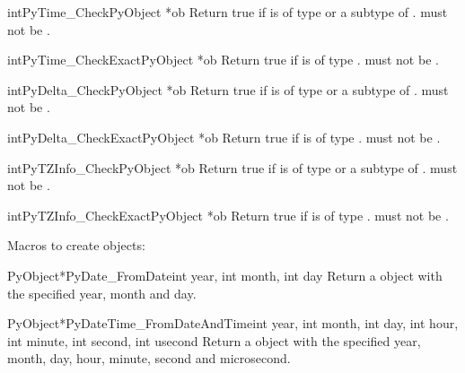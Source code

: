 \begin{cfuncdesc}{int}{PyTime_Check}{PyObject *ob}
  Return true if  is of type  or
  a subtype of .   must not be
  \NULL{}.
\end{cfuncdesc}

\begin{cfuncdesc}{int}{PyTime_CheckExact}{PyObject *ob}
  Return true if  is of type .
   must not be \NULL{}.
\end{cfuncdesc}

\begin{cfuncdesc}{int}{PyDelta_Check}{PyObject *ob}
  Return true if  is of type  or
  a subtype of .   must not be
  \NULL{}.
\end{cfuncdesc}

\begin{cfuncdesc}{int}{PyDelta_CheckExact}{PyObject *ob}
  Return true if  is of type .
   must not be \NULL{}.
\end{cfuncdesc}

\begin{cfuncdesc}{int}{PyTZInfo_Check}{PyObject *ob}
  Return true if  is of type  or
  a subtype of .   must not be
  \NULL{}.
\end{cfuncdesc}

\begin{cfuncdesc}{int}{PyTZInfo_CheckExact}{PyObject *ob}
  Return true if  is of type .
   must not be \NULL{}.
\end{cfuncdesc}

Macros to create objects:

\begin{cfuncdesc}{PyObject*}{PyDate_FromDate}{int year, int month, int day}
  Return a  object with the specified year, month
  and day.
\end{cfuncdesc}

\begin{cfuncdesc}{PyObject*}{PyDateTime_FromDateAndTime}{int year, int month,
        int day, int hour, int minute, int second, int usecond}
  Return a  object with the specified year, month,
  day, hour, minute, second and microsecond.
\end{cfuncdesc}

